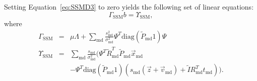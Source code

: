 \documentclass[journal]{IEEEtran}
\newcommand{\trans}[1]{#1^{\scriptscriptstyle T}}
\newcommand{\diag}{\mathrm{diag}}
\begin{document}
Setting Equation~\ref{eq:SSMD3} to zero yields the following set of linear equations:
\begin{equation}\label{eq:SSMD4}
  \Gamma_{\mathrm{SSM}}b = \Upsilon_\mathrm{SSM},
\end{equation}
where
\begin{eqnarray} \label{eq:SSMD5}
\Gamma_{\mathrm{SSM}} &=& \mu\Lambda + \sum_\mathrm{md}\frac{s^2_\mathrm{md}}{\sigma^2_\mathrm{md}}\trans{\Psi}\diag\left(\tilde{P}_\mathrm{md}1\right)\Psi\\
 \Upsilon_{\mathrm{SSM}} &=& \sum_{\mathrm{md}}\frac{s_\mathrm{md}}{\sigma^2_\mathrm{md}}(\trans{\Psi}\trans{\tilde{R}}_\mathrm{md}\tilde{P}_\mathrm{md}\vec{x}_\mathrm{md}\nonumber\\
 && -\trans{\Psi}\diag\left(\tilde{P}_\mathrm{md}1\right)\left(s_\mathrm{md}(\vec{z}+\vec{v}_\mathrm{md})+\tilde{I}\trans{R}_\mathrm{md}t_\mathrm{md}\right))\nonumber.
\end{eqnarray}
\ifCLASSOPTIONcaptionsoff
  \newpage
\fi



\end{document}
